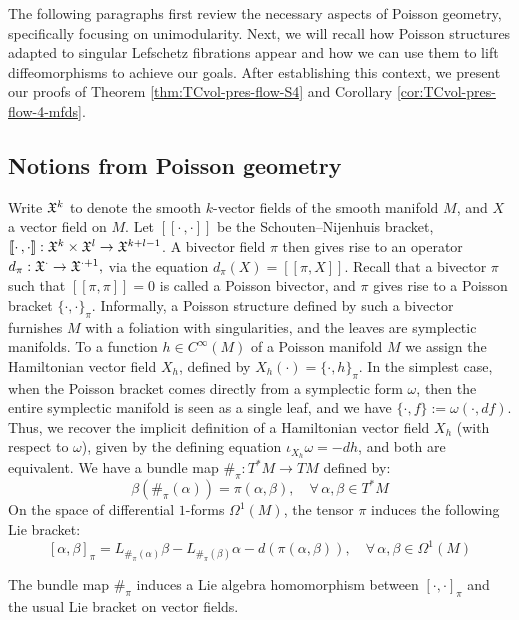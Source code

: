 \documentclass{amsart}
\begin{document}
The following paragraphs first review the necessary aspects of Poisson geometry, specifically focusing on unimodularity. 
Next, we will recall how Poisson structures adapted to singular Lefschetz fibrations appear and how we can use them to lift diffeomorphisms to achieve our goals.
After establishing this context, we present our proofs of Theorem \ref{thm:TCvol-pres-flow-S4} and Corollary \ref{cor:TCvol-pres-flow-4-mfds}. 



\subsection*{Notions from Poisson geometry}

Write $\frak{X}^{k}$ to denote the smooth $k$-vector fields of the smooth manifold $M$, and $X$ a vector field on $M$. Let $[\![ \cdot \, , \cdot ]\!]$ be the Schouten--Nijenhuis bracket, $[\![ \cdot \, , \cdot ]\!]:  \frak{X}^{k} \times \frak{X}^{l} \to \frak{X}^{k+l - 1}$.
 A bivector field $\pi$ then gives rise to an operator $d_{\pi}: \frak{X}^{\cdot }\to \frak{X}^{\cdot + 1},$
 via the equation $d_{\pi}(X)=[\![ \pi, X]\!]$. Recall that a bivector $\pi$ such that $[\![ \pi, \pi ]\!]=0$ is called a Poisson bivector, and $\pi $ gives rise to a Poisson bracket $\{ \cdot,  \cdot \}_{\pi}$. Informally, a Poisson structure defined by such a bivector furnishes $M$ with a foliation with singularities, and the leaves are symplectic manifolds.
 To a function $h\in C^\infty(M)$ of a Poisson manifold $M$ 
we assign the Hamiltonian vector field $X_h$, defined by $X_h(\cdot )=\{\cdot , h \}_{\pi}$. 
In the simplest case, when the Poisson bracket comes directly from a symplectic form $\omega$, then the entire symplectic manifold is seen as a single leaf, and we have $\{ \cdot , f \} := \omega( \cdot , df)$. 
Thus, we recover the implicit definition of a Hamiltonian vector field $X_h$ (with respect to $\omega$), given by the defining equation $\iota_{X_{h}}\omega = -dh$, and both are equivalent.
%
We have a bundle map $\#_{\pi}:T^{*}M\to TM$ defined by: 
\[
\beta( \#_{\pi} (\alpha)) = \pi(\alpha , \beta), \quad \forall\, \alpha, \beta \in T^{*}M
\]
On the space of differential $1$-forms $\Omega^1(M)$, the tensor $\pi$ induces the following  Lie bracket: 
% 
\[
[ \alpha , \beta ]_{\pi} = L_{\#_{\pi}(\alpha)}\beta - L_{\#_{\pi}(\beta)} \alpha - d( \pi ( \alpha , \beta)),  \quad \forall\, \alpha , \beta \in  \Omega^1(M)
\]

The bundle map $\#_{\pi}$ induces a Lie algebra homomorphism between $[ \cdot , \cdot ]_{\pi}$ and the usual Lie bracket on vector fields. 
\end{document}
